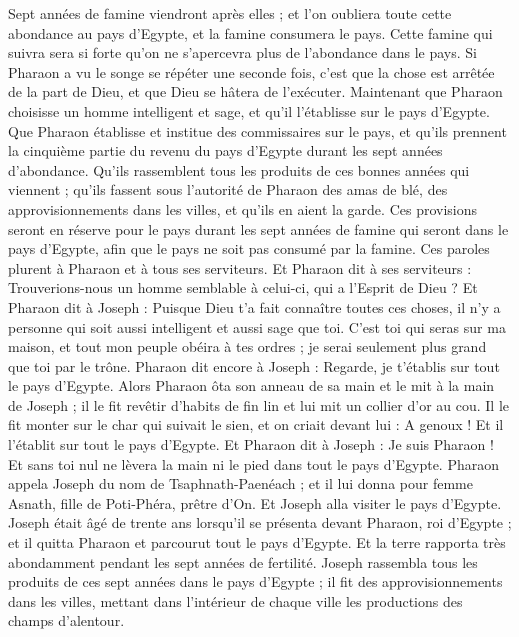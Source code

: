 \begin{multicols}{2}
Sept années de famine viendront après elles ; et l’on oubliera toute cette abondance au pays d’Egypte, et la famine consumera le pays.
Cette famine qui suivra sera si forte qu’on ne s’apercevra plus de l’abondance dans le pays.
Si Pharaon a vu le songe se répéter une seconde fois, c’est que la chose est arrêtée de la part de Dieu, et que Dieu se hâtera de l’exécuter.
Maintenant que Pharaon choisisse un homme intelligent et sage, et qu'il l'établisse sur le pays d'Egypte.
Que Pharaon établisse et institue des commissaires sur le pays, et qu'ils prennent la cinquième partie du revenu du pays d'Egypte durant les sept années d'abondance.
Qu’ils rassemblent tous les produits de ces bonnes années  qui viennent ; qu’ils fassent sous l’autorité de Pharaon des amas de blé, des approvisionnements dans les villes, et qu’ils en aient la garde.
Ces provisions seront en réserve pour le pays durant les sept années de famine qui seront dans le  pays d'Egypte, afin que le pays ne soit pas consumé par la famine.
Ces paroles plurent à Pharaon et à tous ses serviteurs.
Et Pharaon dit à ses serviteurs : Trouverions-nous un homme semblable à celui-ci, qui a l'Esprit de Dieu ?
Et Pharaon dit à Joseph : Puisque Dieu t'a fait connaître toutes ces choses, il n'y a personne qui soit aussi intelligent et aussi sage que toi.
C’est toi qui seras sur ma maison, et tout mon peuple obéira à tes ordres ; je serai seulement plus grand que toi par le trône.
Pharaon dit encore à Joseph : Regarde, je t’établis sur tout le pays d'Egypte.
Alors Pharaon ôta son anneau de sa main et le mit à la main de Joseph ; il le fit revêtir d'habits de fin lin et lui mit un collier d'or au cou.
Il le fit monter sur le char qui suivait le sien, et on criait devant lui : A genoux ! Et il l'établit sur tout le pays d'Egypte.
Et Pharaon dit à Joseph : Je suis Pharaon ! Et sans toi nul ne lèvera la main ni le pied dans tout le pays d'Egypte.
Pharaon appela Joseph du nom de Tsaphnath-Paenéach ; et il lui donna pour femme Asnath, fille de Poti-Phéra, prêtre d'On. Et Joseph alla visiter le pays d'Egypte.
Joseph était âgé de trente ans lorsqu’il se présenta devant Pharaon, roi d'Egypte ; et il quitta Pharaon et parcourut tout le pays d'Egypte.
Et la terre rapporta très abondamment pendant les sept années de fertilité.
Joseph rassembla tous les produits de ces sept années dans le pays d’Egypte ; il fit des approvisionnements dans les villes, mettant dans l’intérieur de chaque ville les productions des champs d’alentour.

\end{multicols}
